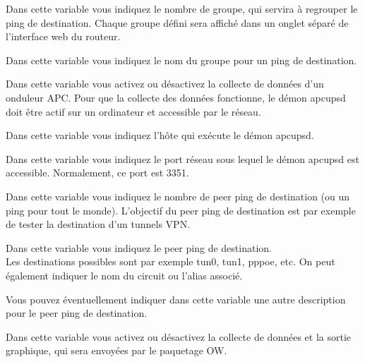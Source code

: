 \begin{description}
  Dans cette variable vous indiquez le nombre de groupe, qui servira à regrouper
  le ping de destination. Chaque groupe défini sera affiché dans un onglet séparé de
  l'interface web du routeur.


  Dans cette variable vous indiquez le nom du groupe pour un ping de destination.


  Dans cette variable vous activez ou désactivez la collecte de données
  d'un onduleur APC. Pour que la collecte des données fonctionne, le démon
  apcupsd doit être actif sur un ordinateur et accessible par le réseau.


  Dans cette variable vous indiquez l'hôte qui exécute le démon apcupsd.


  Dans cette variable vous indiquez le port réseau sous lequel le démon apcupsd
  est accessible. Normalement, ce port est 3351.


  Dans cette variable vous indiquez le nombre de peer ping de destination (ou
  un ping pour tout le monde). L'objectif du peer ping de destination est par
  exemple de tester la destination d'un tunnels VPN.


  Dans cette variable vous indiquez le peer ping de destination.\\
  Les destinations possibles sont par exemple tun0, tun1, pppoe, etc. On peut
  également indiquer le nom du circuit ou l'alias associé.


  Vous pouvez éventuellement indiquer dans cette variable une autre description
  pour le peer ping de destination.


  Dans cette variable vous activez ou désactivez la collecte de données et
  la sortie graphique, qui sera envoyées par le paquetage OW.


\end{description}
